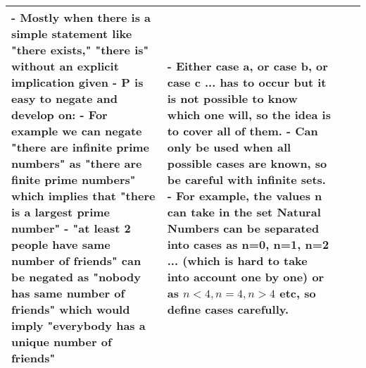 \documentclass[11pt]{article}
\begin{document}
\begin{tabular}{ |m{10em}|m{10em}|m{11em}|m{11em}| }
- Mostly when there is a simple statement like "there exists," "there is" without an explicit implication  given \newline
- P is easy to negate and develop on: \newline
- For example we can negate "there are infinite prime numbers" as "there are finite prime numbers" which implies that "there is a largest prime number" \newline
- "at least 2 people have same number of friends" can be negated as "nobody has same number of friends" which would imply "everybody has a unique number of friends"  & 

- Either case a, or case b, or case c ... has to occur but it is not possible to know which one will, so the idea is to cover all of them. \newline
- Can only be used when all possible cases are known, so be careful with infinite sets. \newline
- For example, the values n can take in the set Natural Numbers can be separated into cases as n=0, n=1, n=2 ... (which is hard to take into account one by one) or as $n<4, n=4, n>4$ etc, so define cases carefully. \\ 
\hline
\end{tabular}


\newpage
\end{document}
